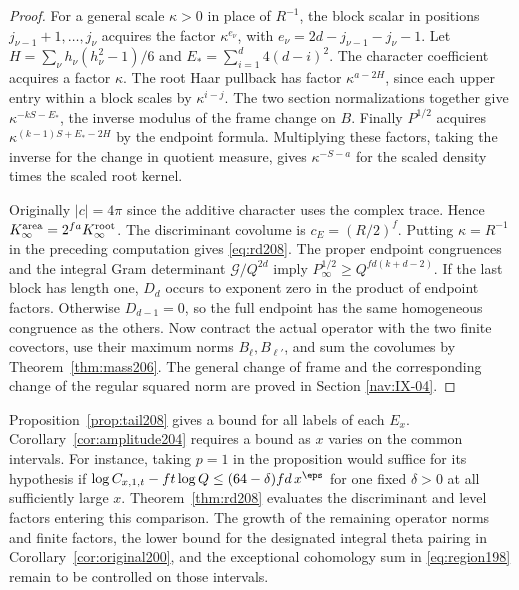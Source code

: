 \documentclass[a4paper,11pt]{article}
\theoremstyle{definition}
\theoremstyle{remark}
\numberwithin{equation}{section}
\begin{document}
\begin{proof}
For a general scale \(\kappa>0\) in place of \(R^{-1}\), the
block scalar in positions \(j_{\nu-1}+1,\ldots,j_\nu\) acquires
the factor \(\kappa^{e_\nu}\), with
\(e_\nu=2d-j_{\nu-1}-j_\nu-1\).
Let \(H=\sum_\nu h_\nu(h_\nu^2-1)/6\) and
\(E_*=\sum_{i=1}^d4(d-i)^2\).
The character coefficient acquires a factor \(\kappa\).
The root Haar pullback has factor \(\kappa^{a-2H}\), since each
upper entry within a block scales by \(\kappa^{i-j}\).
The two section normalizations together give \(\kappa^{-kS-E_*}\),
the inverse modulus of the frame change on \(B\). Finally \(P^{1/2}\)
acquires \(\kappa^{(k-1)S+E_*-2H}\) by the endpoint formula.
Multiplying these factors, taking the inverse for the change in
quotient measure, gives \(\kappa^{-S-a}\) for the scaled
density times the scaled root kernel.

Originally \(|c|=4\pi\) since the additive character uses
the complex trace. Hence \(K_\infty^{\rm area}=2^{fa}K_\infty^{\rm root}\).
The discriminant covolume is \(c_E=(R/2)^f\). Putting
\(\kappa=R^{-1}\) in the preceding computation gives
\eqref{eq:rd208}. The proper endpoint congruences and the integral
Gram determinant \(\mathcal G/Q^{2d}\) imply
\(P_\infty^{1/2}\ge Q^{fd(k+d-2)}\). If the last block has length
one, \(D_d\) occurs to exponent zero in the product of endpoint
factors. Otherwise \(D_{d-1}=0\), so the full endpoint has the
same homogeneous congruence as the others. Now contract the actual
operator with the two finite covectors, use their maximum norms
\(B_\ell,B_{\ell'}\), and sum the covolumes by
Theorem~\ref{thm:mass206}. The general change of frame and the
corresponding change of the regular squared norm are proved in
Section \ref{nav:IX-04}.
\end{proof}

Proposition~\ref{prop:tail208} gives a bound for all labels of
each \(E_x\). Corollary~\ref{cor:amplitude204} requires a bound
as \(x\) varies on the common intervals. For instance, taking
\(p=1\) in the proposition would suffice for its hypothesis if
\(\log C_{x,1,t}-ft\log Q\le(64-\delta)fd\,x^\eps\) for one
fixed \(\delta>0\) at all sufficiently large \(x\).
Theorem~\ref{thm:rd208} evaluates the discriminant and level
factors entering this comparison. The growth of the remaining
operator norms and finite factors, the lower bound for the
designated integral theta pairing in Corollary~\ref{cor:original200},
and the exceptional cohomology sum in \eqref{eq:region198}
remain to be controlled on those intervals.
\end{document}
